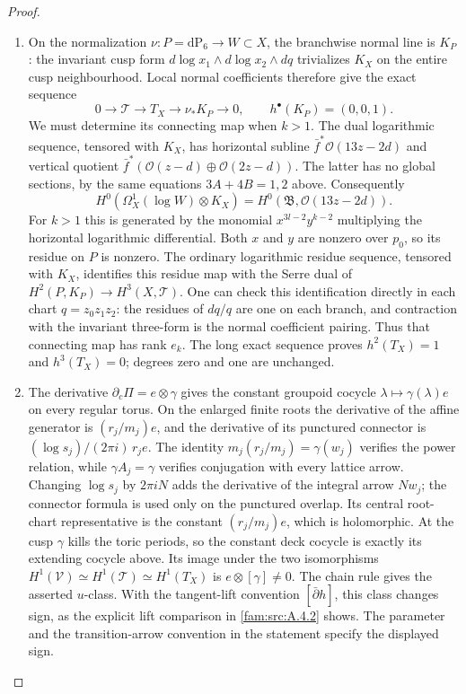 \begin{proof}
\begin{enumerate}[label=\arabic*.,leftmargin=*]
\item On the normalization $\nu:P=\mathrm{dP}_6\to W\subset X$,
the branchwise normal line is $K_P$: the invariant cusp form
$d\log x_1\wedge d\log x_2\wedge dq$ trivializes $K_X$
on the entire cusp neighbourhood.  Local normal coefficients
therefore give the exact sequence
\[
 0\longrightarrow\mathcal T\longrightarrow T_X
 \longrightarrow\nu_*K_P\longrightarrow0,
 \qquad h^\bullet(K_P)=(0,0,1).
\]
We must determine its connecting map when $k>1$.
The dual logarithmic sequence, tensored with $K_X$, has horizontal
subline $\bar f^*\mathcal O(13z-2d)$ and vertical quotient
$\bar f^*(\mathcal O(z-d)\oplus\mathcal O(2z-d))$.
The latter has no global sections, by the same equations
$3A+4B=1,2$ above.  Consequently
\[
 H^0(\Omega_X^1(\log W)\otimes K_X)
 =H^0(\mathfrak B,\mathcal O(13z-2d)).
\]
For $k>1$ this is generated by the monomial
$x^{3l-2}y^{k-2}$ multiplying the horizontal logarithmic
differential.  Both $x$ and $y$ are nonzero over $p_0$, so its
residue on $P$ is nonzero.  The ordinary logarithmic residue
sequence, tensored with $K_X$, identifies this residue map with
the Serre dual of
$H^2(P,K_P)\to H^3(X,\mathcal T)$.
One can check this identification directly in each chart
$q=z_0z_1z_2$: the residues of $dq/q$ are one on each branch,
and contraction with the invariant three-form is the normal
coefficient pairing.  Thus that connecting map has rank $e_k$.
The long exact sequence proves $h^2(T_X)=1$ and $h^3(T_X)=0$;
degrees zero and one are unchanged.

\item The derivative $\partial_c\Pi=e\otimes\gamma$ gives the constant
groupoid cocycle $\lambda\mapsto\gamma(\lambda)e$ on every
regular torus.  On the enlarged finite roots the derivative of the
affine generator is $(r_j/m_j)e$, and the derivative of its
punctured connector is $(\log s_j)/(2\pi i)\,r_je$.
The identity $m_j(r_j/m_j)=\gamma(w_j)$ verifies the power
relation, while $\gamma A_j=\gamma$ verifies conjugation with
every lattice arrow.  Changing $\log s_j$ by $2\pi i N$
adds the derivative of the integral arrow $Nw_j$; the connector
formula is used only on the punctured overlap.  Its central
root-chart representative is the constant $(r_j/m_j)e$,
which is holomorphic.  At the cusp $\gamma$ kills the toric periods,
so the constant deck cocycle is exactly its extending cocycle
above.  Its image under the two isomorphisms
$H^1(\mathcal V)\simeq H^1(\mathcal T)\simeq H^1(T_X)$
is $e\otimes[\gamma]\ne0$.  The chain rule gives the asserted
$u$-class.  With the tangent-lift convention $[\bar\partial h]$, this
class changes sign, as the explicit lift comparison in
\cref{fam:src:A.4.2} shows. The parameter and the transition-arrow
convention in the statement specify the displayed sign.


\end{enumerate}
\end{proof}
